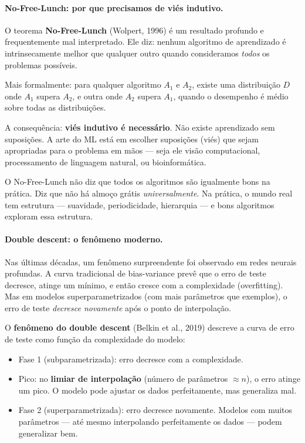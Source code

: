 \documentclass{tufte-handout}
\begin{document}
\paragraph{No-Free-Lunch: por que precisamos de viés indutivo.}

O teorema \textbf{No-Free-Lunch} (Wolpert, 1996) é um resultado profundo e frequentemente mal interpretado. Ele diz: nenhum algoritmo de aprendizado é intrinsecamente melhor que qualquer outro quando consideramos \textit{todos} os problemas possíveis.

Mais formalmente: para qualquer algoritmo $A_1$ e $A_2$, existe uma distribuição $D$ onde $A_1$ supera $A_2$, e outra onde $A_2$ supera $A_1$, quando o desempenho é médio sobre todas as distribuições.

A consequência: \textbf{viés indutivo é necessário}. Não existe aprendizado sem suposições. A arte do ML está em escolher suposições (viés) que sejam apropriadas para o problema em mãos --- seja ele visão computacional, processamento de linguagem natural, ou bioinformática.

\begin{remark}
    O No-Free-Lunch não diz que todos os algoritmos são igualmente bons na prática. Diz que não há almoço grátis \textit{universalmente}. Na prática, o mundo real tem estrutura --- suavidade, periodicidade, hierarquia --- e bons algoritmos exploram essa estrutura.
\end{remark}

\paragraph{Double descent: o fenômeno moderno.}

Nas últimas décadas, um fenômeno surpreendente foi observado em redes neurais profundas. A curva tradicional de bias-variance prevê que o erro de teste decresce, atinge um mínimo, e então cresce com a complexidade (overfitting). Mas em modelos superparametrizados (com mais parâmetros que exemplos), o erro de teste \textit{decresce novamente} após o ponto de interpolação.

\begin{defn}
    O \textbf{fenômeno do double descent} (Belkin et al., 2019) descreve a curva de erro de teste como função da complexidade do modelo:
    \begin{itemize}
        \item Fase 1 (subparametrizada): erro decresce com a complexidade.
        \item Pico: no \textbf{limiar de interpolação} (número de parâmetros $\approx n$), o erro atinge um pico. O modelo pode ajustar os dados perfeitamente, mas generaliza mal.
        \item Fase 2 (superparametrizada): erro decresce novamente. Modelos com muitos parâmetros --- até mesmo interpolando perfeitamente os dados --- podem generalizar bem.
    \end{itemize}
\end{defn}
\end{document}
